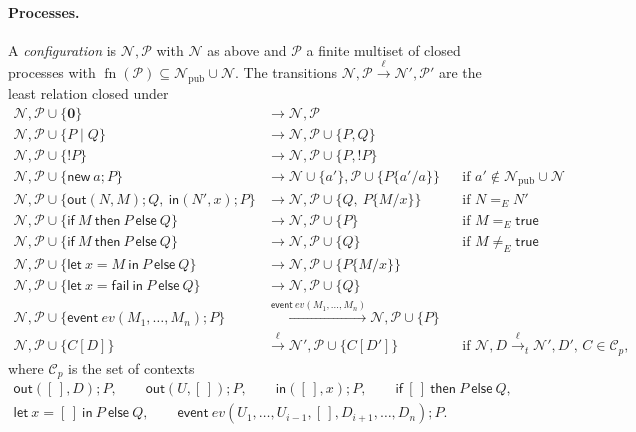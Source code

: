 \documentclass[11pt]{article}
\theoremstyle{definition}
\theoremstyle{plain}
\theoremstyle{remark}
\newcommand{\fn}{\operatorname{fn}}
\begin{document}
\paragraph{Processes.} A \emph{configuration} is $\mathcal{N},\mathcal{P}$ with $\mathcal{N}$ as above and $\mathcal{P}$ a finite multiset of closed processes with $\fn(\mathcal{P})\subseteq\mathcal{N}_{\mathrm{pub}}\cup\mathcal{N}$. The transitions $\mathcal{N},\mathcal{P}\xrightarrow{\ell}\mathcal{N}',\mathcal{P}'$ are the least relation closed under
\begin{align*}
\mathcal{N},\mathcal{P}\cup\{\mathbf{0}\}&\to\mathcal{N},\mathcal{P}\\
\mathcal{N},\mathcal{P}\cup\{P\mid Q\}&\to\mathcal{N},\mathcal{P}\cup\{P,Q\}\\
\mathcal{N},\mathcal{P}\cup\{!P\}&\to\mathcal{N},\mathcal{P}\cup\{P,!P\}\\
\mathcal{N},\mathcal{P}\cup\{\mathsf{new}\ a;P\}&\to\mathcal{N}\cup\{a'\},\mathcal{P}\cup\{P\{a'/a\}\} &&\text{if }a'\notin\mathcal{N}_{\mathrm{pub}}\cup\mathcal{N}\\
\mathcal{N},\mathcal{P}\cup\{\mathsf{out}(N,M);Q,\ \mathsf{in}(N',x);P\}&\to\mathcal{N},\mathcal{P}\cup\{Q,\ P\{M/x\}\} &&\text{if }N=_E N'\\
\mathcal{N},\mathcal{P}\cup\{\mathsf{if}\ M\ \mathsf{then}\ P\ \mathsf{else}\ Q\}&\to\mathcal{N},\mathcal{P}\cup\{P\} &&\text{if }M=_E\mathsf{true}\\
\mathcal{N},\mathcal{P}\cup\{\mathsf{if}\ M\ \mathsf{then}\ P\ \mathsf{else}\ Q\}&\to\mathcal{N},\mathcal{P}\cup\{Q\} &&\text{if }M\ne_E\mathsf{true}\\
\mathcal{N},\mathcal{P}\cup\{\mathsf{let}\ x=M\ \mathsf{in}\ P\ \mathsf{else}\ Q\}&\to\mathcal{N},\mathcal{P}\cup\{P\{M/x\}\}\\
\mathcal{N},\mathcal{P}\cup\{\mathsf{let}\ x=\mathsf{fail}\ \mathsf{in}\ P\ \mathsf{else}\ Q\}&\to\mathcal{N},\mathcal{P}\cup\{Q\}\\
\mathcal{N},\mathcal{P}\cup\{\mathsf{event}\ ev(M_1,\dots,M_n);P\}&\xrightarrow{\mathsf{event}\ ev(M_1,\dots,M_n)}\mathcal{N},\mathcal{P}\cup\{P\}\\
\mathcal{N},\mathcal{P}\cup\{C[D]\}&\xrightarrow{\ell}\mathcal{N}',\mathcal{P}\cup\{C[D']\} &&\text{if }\mathcal{N},D\xrightarrow{\ell}_t\mathcal{N}',D'\text{, }C\in\mathcal{C}_p,
\end{align*}
where $\mathcal{C}_p$ is the set of contexts
\begin{gather*}
\mathsf{out}([\,],D);P,\qquad
\mathsf{out}(U,[\,]);P,\qquad
\mathsf{in}([\,],x);P,\qquad
\mathsf{if}\ [\,]\ \mathsf{then}\ P\ \mathsf{else}\ Q,\\
\mathsf{let}\ x=[\,]\ \mathsf{in}\ P\ \mathsf{else}\ Q,\qquad
\mathsf{event}\ ev(U_1,\dots,U_{i-1},[\,],D_{i+1},\dots,D_n);P.
\end{gather*}
\end{document}
